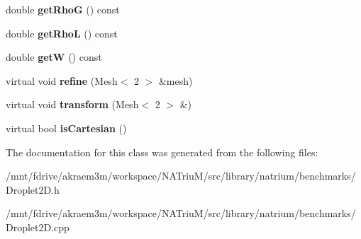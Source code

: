 \begin{DoxyCompactItemize}
\item 
\hypertarget{classnatrium_1_1Droplet2D_a38108f253c1163e597741a805b31e7b7}{
double {\bfseries getRhoG} () const }
\label{classnatrium_1_1Droplet2D_a38108f253c1163e597741a805b31e7b7}

\item 
\hypertarget{classnatrium_1_1Droplet2D_a7f9dfc43e87cf272b9dc3d38392a4c85}{
double {\bfseries getRhoL} () const }
\label{classnatrium_1_1Droplet2D_a7f9dfc43e87cf272b9dc3d38392a4c85}

\item 
\hypertarget{classnatrium_1_1Droplet2D_a054fd09e2aafc7580f45c77e7b70e374}{
double {\bfseries getW} () const }
\label{classnatrium_1_1Droplet2D_a054fd09e2aafc7580f45c77e7b70e374}

\item 
\hypertarget{classnatrium_1_1Droplet2D_a318a82c0ce91f37095db11e87b73419c}{
virtual void {\bfseries refine} (Mesh$<$ 2 $>$ \&mesh)}
\label{classnatrium_1_1Droplet2D_a318a82c0ce91f37095db11e87b73419c}

\item 
\hypertarget{classnatrium_1_1Droplet2D_ae37e598c7ccd5ae4b5b23fe02fc14857}{
virtual void {\bfseries transform} (Mesh$<$ 2 $>$ \&)}
\label{classnatrium_1_1Droplet2D_ae37e598c7ccd5ae4b5b23fe02fc14857}

\item 
\hypertarget{classnatrium_1_1Droplet2D_a9a11fe76cdc806cf6a1cfdae374ea129}{
virtual bool {\bfseries isCartesian} ()}
\label{classnatrium_1_1Droplet2D_a9a11fe76cdc806cf6a1cfdae374ea129}

\end{DoxyCompactItemize}


The documentation for this class was generated from the following files:\begin{DoxyCompactItemize}
\item 
/mnt/fdrive/akraem3m/workspace/NATriuM/src/library/natrium/benchmarks/Droplet2D.h\item 
/mnt/fdrive/akraem3m/workspace/NATriuM/src/library/natrium/benchmarks/Droplet2D.cpp\end{DoxyCompactItemize}
